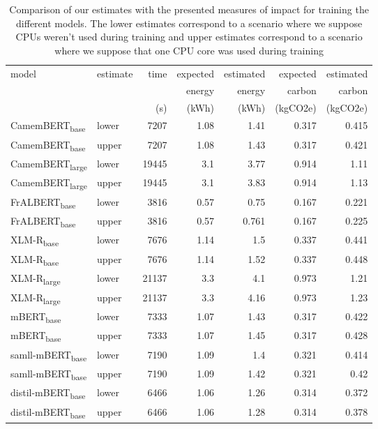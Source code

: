 \documentclass[11pt]{article}
\begin{document}
\begin{table}[htbp]
\caption{Comparison of our estimates with the presented measures of impact for training the different models. The lower estimates correspond to a scenario where we suppose CPUs weren't used during training and upper estimates correspond to a scenario where we suppose that one CPU core was used  during training}
\centering
\begin{tabular}{llrrrrr}
model & estimate & time & expected & estimated & expected & estimated\\
 &  &  & energy & energy & carbon & carbon\\
 &  & (s) & (kWh) & (kWh) & (kgCO2e) & (kgCO2e)\\
\hline
CamemBERT\textsubscript{base} & lower & 7207 & 1.08 & 1.41 & 0.317 & 0.415\\
CamemBERT\textsubscript{base} & upper & 7207 & 1.08 & 1.43 & 0.317 & 0.421\\
CamemBERT\textsubscript{large} & lower & 19445 & 3.1 & 3.77 & 0.914 & 1.11\\
CamemBERT\textsubscript{large} & upper & 19445 & 3.1 & 3.83 & 0.914 & 1.13\\
FrALBERT\textsubscript{base} & lower & 3816 & 0.57 & 0.75 & 0.167 & 0.221\\
FrALBERT\textsubscript{base} & upper & 3816 & 0.57 & 0.761 & 0.167 & 0.225\\
XLM-R\textsubscript{base} & lower & 7676 & 1.14 & 1.5 & 0.337 & 0.441\\
XLM-R\textsubscript{base} & upper & 7676 & 1.14 & 1.52 & 0.337 & 0.448\\
XLM-R\textsubscript{large} & lower & 21137 & 3.3 & 4.1 & 0.973 & 1.21\\
XLM-R\textsubscript{large} & upper & 21137 & 3.3 & 4.16 & 0.973 & 1.23\\
mBERT\textsubscript{base} & lower & 7333 & 1.07 & 1.43 & 0.317 & 0.422\\
mBERT\textsubscript{base} & upper & 7333 & 1.07 & 1.45 & 0.317 & 0.428\\
samll-mBERT\textsubscript{base} & lower & 7190 & 1.09 & 1.4 & 0.321 & 0.414\\
samll-mBERT\textsubscript{base} & upper & 7190 & 1.09 & 1.42 & 0.321 & 0.42\\
distil-mBERT\textsubscript{base} & lower & 6466 & 1.06 & 1.26 & 0.314 & 0.372\\
distil-mBERT\textsubscript{base} & upper & 6466 & 1.06 & 1.28 & 0.314 & 0.378\\
\end{tabular}
\end{table}
\end{document}
